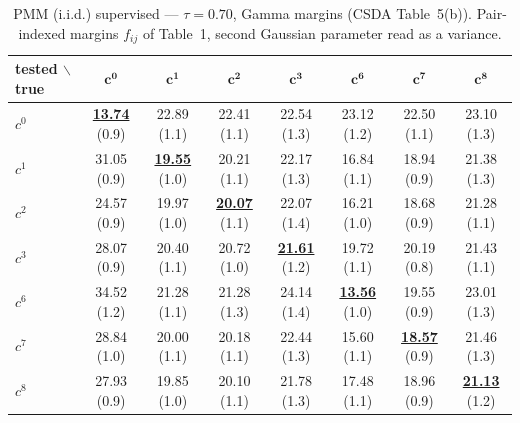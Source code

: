 \begin{table}[htbp]
  \centering
  \small
  \setlength{\tabcolsep}{4pt}
  \caption{PMM (i.i.d.) supervised — $\tau = 0.70$, Gamma margins (CSDA Table~5(b)). Pair-indexed margins $f_{ij}$ of Table~1, second Gaussian parameter read as a variance.}
  \label{tab:exp2-high_tau_gamma}
  \begin{tabular}{lccccccc}
    \toprule
    tested $\backslash$ true & $\mathbf{c^{0}}$ & $\mathbf{c^{1}}$ & $\mathbf{c^{2}}$ & $\mathbf{c^{3}}$ & $\mathbf{c^{6}}$ & $\mathbf{c^{7}}$ & $\mathbf{c^{8}}$ \\
    \midrule
    $c^{0}$ & \textbf{\underline{13.74}} (0.9) & 22.89 (1.1) & 22.41 (1.1) & 22.54 (1.3) & 23.12 (1.2) & 22.50 (1.1) & 23.10 (1.3) \\
    $c^{1}$ & 31.05 (0.9) & \textbf{\underline{19.55}} (1.0) & 20.21 (1.1) & 22.17 (1.3) & 16.84 (1.1) & 18.94 (0.9) & 21.38 (1.3) \\
    $c^{2}$ & 24.57 (0.9) & 19.97 (1.0) & \textbf{\underline{20.07}} (1.1) & 22.07 (1.4) & 16.21 (1.0) & 18.68 (0.9) & 21.28 (1.1) \\
    $c^{3}$ & 28.07 (0.9) & 20.40 (1.1) & 20.72 (1.0) & \textbf{\underline{21.61}} (1.2) & 19.72 (1.1) & 20.19 (0.8) & 21.43 (1.1) \\
    $c^{6}$ & 34.52 (1.2) & 21.28 (1.1) & 21.28 (1.3) & 24.14 (1.4) & \textbf{\underline{13.56}} (1.0) & 19.55 (0.9) & 23.01 (1.3) \\
    $c^{7}$ & 28.84 (1.0) & 20.00 (1.1) & 20.18 (1.1) & 22.44 (1.3) & 15.60 (1.1) & \textbf{\underline{18.57}} (0.9) & 21.46 (1.3) \\
    $c^{8}$ & 27.93 (0.9) & 19.85 (1.0) & 20.10 (1.1) & 21.78 (1.3) & 17.48 (1.1) & 18.96 (0.9) & \textbf{\underline{21.13}} (1.2) \\
    \bottomrule
  \end{tabular}
\end{table}
